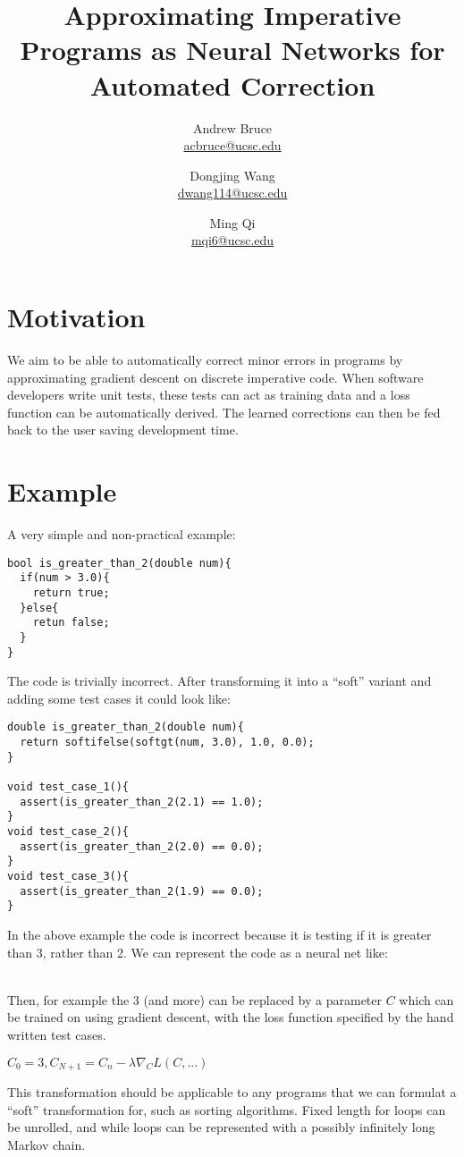 \documentclass{article}
\title{Approximating Imperative Programs as Neural Networks for Automated Correction}
\author{Andrew Bruce \\ \href{mailto:acbruce@ucsc.edu}{acbruce@ucsc.edu}
  \and Dongjing Wang \\ \href{mailto:dwang114@ucsc.edu}{dwang114@ucsc.edu}
  \and Ming Qi \\ \href{mailto:mqi6@ucsc.edu}{mqi6@ucsc.edu} }
\begin{document}
\maketitle
{}
\section*{Motivation}
We aim to be able to automatically correct minor errors in programs by approximating gradient descent on discrete imperative code. When software developers write unit tests, these tests can act as training data and a loss function can be automatically derived. The learned corrections can then be fed back to the user saving development time.
\section*{Example}
A very simple and non-practical example:
\begin{verbatim}
bool is_greater_than_2(double num){
  if(num > 3.0){
    return true;
  }else{
    retun false;
  }
}
\end{verbatim}
The code is trivially incorrect. After transforming it into a ``soft'' variant and adding some test cases it could look like:
\begin{verbatim}
double is_greater_than_2(double num){
  return softifelse(softgt(num, 3.0), 1.0, 0.0);
}

void test_case_1(){
  assert(is_greater_than_2(2.1) == 1.0);
}
void test_case_2(){
  assert(is_greater_than_2(2.0) == 0.0);
}
void test_case_3(){
  assert(is_greater_than_2(1.9) == 0.0);
}
\end{verbatim}
In the above example the code is incorrect because it is testing if it is greater than 3, rather than 2. We can represent the code as a neural net like:\\
\\
Then, for example the 3 (and more) can be replaced by a parameter $C$ which can be trained on using gradient descent, with the loss function specified by the hand written test cases.
\begin{center}
  $C_0 = 3, C_{N+1} = C_{n} - \lambda \nabla_C L(C, ...)$
\end{center}
This transformation should be applicable to any programs that we can formulat a ``soft'' transformation for, such as sorting algorithms. Fixed length for loops can be unrolled, and while loops can be represented with a possibly infinitely long Markov chain.
\end{document}
